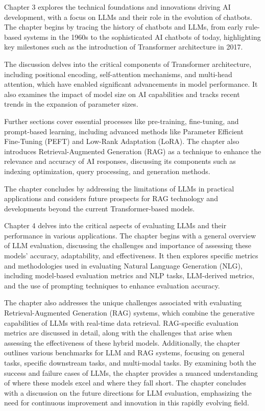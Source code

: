 Chapter 3 explores the technical foundations and innovations driving AI development, with a focus on LLMs and their role in the evolution of chatbots. The chapter begins by tracing the history of chatbots and LLMs, from early rule-based systems in the 1960s to the sophisticated AI chatbots of today, highlighting key milestones such as the introduction of Transformer architecture in 2017.

The discussion delves into the critical components of Transformer architecture, including positional encoding, self-attention mechanisms, and multi-head attention, which have enabled significant advancements in model performance. It also examines the impact of model size on AI capabilities and tracks recent trends in the expansion of parameter sizes.

Further sections cover essential processes like pre-training, fine-tuning, and prompt-based learning, including advanced methods like Parameter Efficient Fine-Tuning (PEFT) and Low-Rank Adaptation (LoRA). The chapter also introduces Retrieval-Augmented Generation (RAG) as a technique to enhance the relevance and accuracy of AI responses, discussing its components such as indexing optimization, query processing, and generation methods.

The chapter concludes by addressing the limitations of LLMs in practical applications and considers future prospects for RAG technology and developments beyond the current Transformer-based models.

Chapter 4 delves into the critical aspects of evaluating LLMs and their performance in various applications. The chapter begins with a general overview of LLM evaluation, discussing the challenges and importance of assessing these models’ accuracy, adaptability, and effectiveness. It then explores specific metrics and methodologies used in evaluating Natural Language Generation (NLG), including model-based evaluation metrics and NLP tasks, LLM-derived metrics, and the use of prompting techniques to enhance evaluation accuracy.

The chapter also addresses the unique challenges associated with evaluating Retrieval-Augmented Generation (RAG) systems, which combine the generative capabilities of LLMs with real-time data retrieval. RAG-specific evaluation metrics are discussed in detail, along with the challenges that arise when assessing the effectiveness of these hybrid models. Additionally, the chapter outlines various benchmarks for LLM and RAG systems, focusing on general tasks, specific downstream tasks, and multi-modal tasks. By examining both the success and failure cases of LLMs, the chapter provides a nuanced understanding of where these models excel and where they fall short. The chapter concludes with a discussion on the future directions for LLM evaluation, emphasizing the need for continuous improvement and innovation in this rapidly evolving field.

